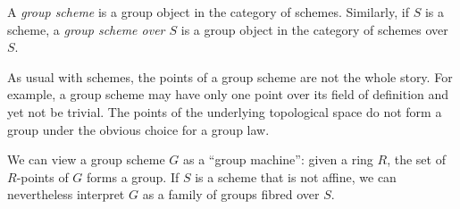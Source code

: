 \documentclass[12pt]{article}
\begin{document}
A \emph{group scheme} is a group object in the category of schemes.  Similarly, if $S$ is a scheme, a \emph{group scheme over $S$} is a group object in the category of schemes over $S$.

As usual with schemes, the points of a group scheme are not the whole story.  For example, a group scheme may have only one point over its field of definition and yet not be trivial.  The points of the underlying topological space do not form a group under the obvious choice for a group law. 

We can view a group scheme $G$ as a ``group machine'': given a ring $R$, the set of $R$-points of $G$ forms a group.  If $S$ is a scheme that is not affine, we can nevertheless interpret $G$ as a family of groups fibred over $S$.
\end{document}
